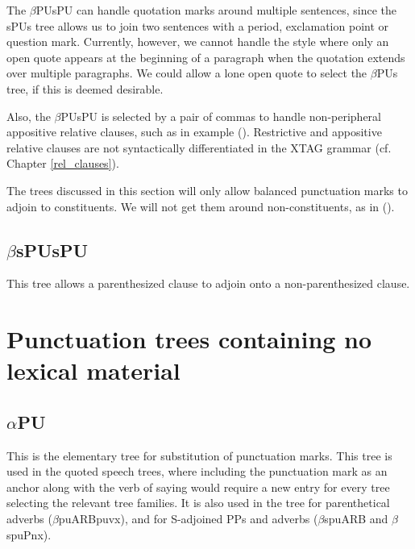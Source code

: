
The $\beta$PUsPU can handle quotation marks around multiple sentences,
since the sPUs tree allows us to join two sentences with a period,
exclamation point or question mark. Currently, however, we cannot
handle the style where only an open quote appears at the beginning of
a paragraph when the quotation extends over multiple
paragraphs. We could allow a lone open quote to select the $\beta$PUs
tree, if this is deemed desirable.

Also, the $\beta$PUsPU is selected by a pair of commas to handle
non-peripheral appositive relative clauses, such as in example
(). Restrictive and appositive relative clauses are not
syntactically differentiated in the XTAG grammar
(cf. Chapter \ref{rel_clauses}).


The trees discussed in this section will only allow balanced
punctuation marks to adjoin to constituents. We will not get them
around non-constituents, as in ().


\subsection{$\beta$sPUsPU}

This tree allows a parenthesized clause to adjoin onto a
non-parenthesized clause.


\section{Punctuation trees containing no lexical material}

\subsection{$\alpha$PU}

This is the elementary tree for substitution of punctuation
marks. This tree is used in the quoted speech trees, where including
the punctuation mark as an anchor along with the verb of saying would
require a new entry for every tree selecting the relevant tree
families. It is also used in the tree for parenthetical adverbs
($\beta$puARBpuvx), and for S-adjoined PPs and adverbs ($\beta$spuARB
and $\beta$spuPnx).


